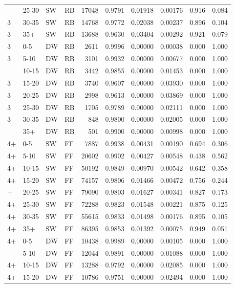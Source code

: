 \documentclass[
  11pt,
]{article}
\begin{document}
\begin{longtable}{llllrrrrrr}
\addlinespace
3 & 25-30 & SW & RB & 17048 & 0.9791 & 0.01918 & 0.00176 & 0.916 & 0.084\\
3 & 30-35 & SW & RB & 14768 & 0.9772 & 0.02038 & 0.00237 & 0.896 & 0.104\\
3 & 35+ & SW & RB & 13688 & 0.9630 & 0.03404 & 0.00292 & 0.921 & 0.079\\
3 & 0-5 & DW & RB & 2611 & 0.9996 & 0.00000 & 0.00038 & 0.000 & 1.000\\
3 & 5-10 & DW & RB & 3101 & 0.9932 & 0.00000 & 0.00677 & 0.000 & 1.000\\
\addlinespace
3 & 10-15 & DW & RB & 3442 & 0.9855 & 0.00000 & 0.01453 & 0.000 & 1.000\\
3 & 15-20 & DW & RB & 3740 & 0.9607 & 0.00000 & 0.03930 & 0.000 & 1.000\\
3 & 20-25 & DW & RB & 2998 & 0.9613 & 0.00000 & 0.03869 & 0.000 & 1.000\\
3 & 25-30 & DW & RB & 1705 & 0.9789 & 0.00000 & 0.02111 & 0.000 & 1.000\\
3 & 30-35 & DW & RB & 848 & 0.9800 & 0.00000 & 0.02005 & 0.000 & 1.000\\
\addlinespace
3 & 35+ & DW & RB & 501 & 0.9900 & 0.00000 & 0.00998 & 0.000 & 1.000\\
4+ & 0-5 & SW & FF & 7887 & 0.9938 & 0.00431 & 0.00190 & 0.694 & 0.306\\
4+ & 5-10 & SW & FF & 20602 & 0.9902 & 0.00427 & 0.00548 & 0.438 & 0.562\\
4+ & 10-15 & SW & FF & 50192 & 0.9849 & 0.00970 & 0.00542 & 0.642 & 0.358\\
4+ & 15-20 & SW & FF & 74157 & 0.9806 & 0.01466 & 0.00472 & 0.756 & 0.244\\
\addlinespace
4+ & 20-25 & SW & FF & 79090 & 0.9803 & 0.01627 & 0.00341 & 0.827 & 0.173\\
4+ & 25-30 & SW & FF & 72288 & 0.9823 & 0.01548 & 0.00221 & 0.875 & 0.125\\
4+ & 30-35 & SW & FF & 55615 & 0.9833 & 0.01498 & 0.00176 & 0.895 & 0.105\\
4+ & 35+ & SW & FF & 86395 & 0.9853 & 0.01392 & 0.00075 & 0.949 & 0.051\\
4+ & 0-5 & DW & FF & 10438 & 0.9989 & 0.00000 & 0.00105 & 0.000 & 1.000\\
\addlinespace
4+ & 5-10 & DW & FF & 12044 & 0.9891 & 0.00000 & 0.01088 & 0.000 & 1.000\\
4+ & 10-15 & DW & FF & 13288 & 0.9792 & 0.00000 & 0.02085 & 0.000 & 1.000\\
4+ & 15-20 & DW & FF & 10786 & 0.9751 & 0.00000 & 0.02494 & 0.000 & 1.000\\

\end{longtable}
\end{document}
